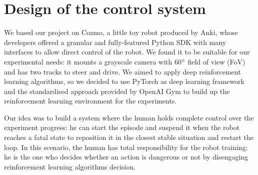 \documentclass[10pt,twocolumn,letterpaper]{article}
\begin{document}

\section{Design of the control system}

We based our project on Cozmo, a little toy robot produced by Anki, whose developers offered a granular and fully-featured Python SDK with many interfaces to allow direct control of the robot.
We found it to be suitable for our experimental needs: it mounts a grayscale camera with 60$\degree$ field of view (FoV) and has two tracks to steer and drive.
We aimed to apply deep reinforcement learning algorithms, so we decided to use PyTorch as deep learning framework and the standardised approach provided by OpenAI Gym to build up the reinforcement learning environment for the experiments.

Our idea was to build a system where the human holds complete control over the experiment progress: he can start the episode and suspend it when the robot reaches a fatal state to reposition it in the closest stable situation and restart the loop.
In this scenario, the human has total responsibility for the robot training: he is the one who decides whether an action is dangerous or not by disengaging reinforcement learning algorithms decision.
\end{document}
